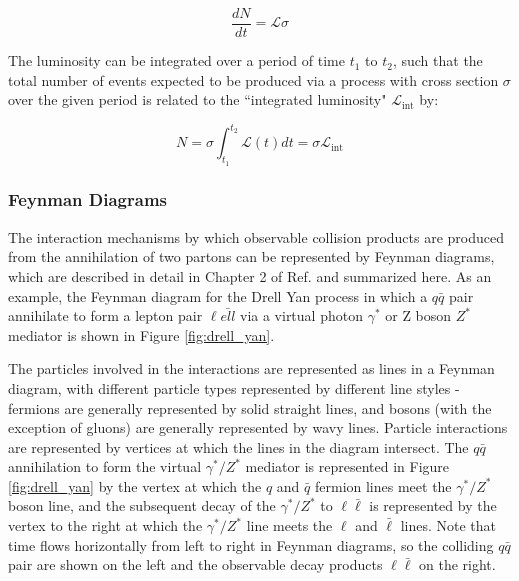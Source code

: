 \begin{equation}
\frac{dN}{dt} = \mathcal{L}\sigma
\end{equation}

The luminosity can be integrated over a period of time \(t_1\) to \(t_2\), such that the total number of events expected to be produced via a process with cross section \(\sigma\) over the given period is related to the ``integrated luminosity" \(\mathcal{L}_\text{int}\) by:

\begin{equation}
\label{eq:integrated_lumi}
N = \sigma\int_{t_1}^{t_2}\mathcal{L}(t)dt = \sigma\mathcal{L}_\text{int}
\end{equation}

\subsubsection{Feynman Diagrams}

The interaction mechanisms by which observable collision products are produced from the annihilation of two partons can be represented by Feynman diagrams, which are described in detail in Chapter 2 of Ref. \cite{griffiths_2008} and summarized here. As an example, the Feynman diagram for the Drell Yan process in which a \(q\bar{q}\) pair annihilate to form a lepton pair \(\ell\bar{ell}\) via a virtual photon \(\gamma^{*}\) or Z boson \(Z^{*}\) mediator is shown in Figure \ref{fig:drell_yan}. 

The particles involved in the interactions are represented as lines in a Feynman diagram, with different particle types represented by different line styles - fermions are generally represented by solid straight lines, and bosons (with the exception of gluons) are generally represented by wavy lines. Particle interactions are represented by vertices at which the lines in the diagram intersect. The \(q\bar{q}\) annihilation to form the virtual \(\gamma^{*}/Z^{*}\) mediator is represented in Figure \ref{fig:drell_yan} by the vertex at which the \(q\) and \(\bar{q}\) fermion lines meet the \(\gamma^{*}/Z^{*}\) boson line, and the subsequent decay of the  \(\gamma^{*}/Z^{*}\) to \(\ell\bar{\ell}\) is represented by the vertex to the right at which the \(\gamma^{*}/Z^{*}\) line meets the \(\ell\) and \(\bar{\ell}\) lines. Note that time flows horizontally from left to right in Feynman diagrams, so the colliding \(q\bar{q}\) pair are shown on the left and the observable decay products \(\ell\bar{\ell}\) on the right.


